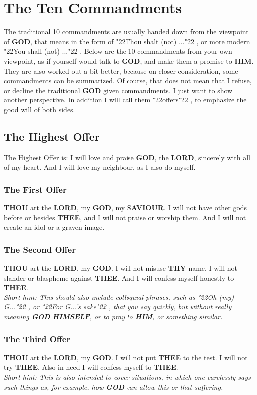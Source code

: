 \documentclass[12pt,a4paper]{article}
\newcommand{\God}[0]{\textbf{GOD}}
\newcommand{\Him}[0]{\textbf{HIM}}
\newcommand{\Himself}[0]{\textbf{HIMSELF}}
\newcommand{\Lord}[0]{\textbf{LORD}}
\newcommand{\Saviour}[0]{\textbf{SAVIOUR}}
\newcommand{\Thee}[0]{\textbf{THEE}}
\newcommand{\Thou}[0]{\textbf{THOU}}
\newcommand{\Thy}[0]{\textbf{THY}}
\newcommand{\q}[1]{\char"22{#1}\char"22 }
\begin{document}
	\section{The Ten Commandments}
		The traditional 10 commandments are usually handed down from the viewpoint of {\God},
		that means in the form of \q{Thou shalt (not) ...},
		or more modern \q{You shall (not) ...}.
		Below are the 10 commandments from your own viewpoint,
		as if yourself would talk to {\God},
		and make them a promise to {\Him}.
		They are also worked out a bit better,
		because on closer consideration,
		some commandments can be summarized.
		Of course,
		that does not mean that I refuse,
		or decline the traditional {\God} given commandments.
		I just want to show another perspective.
		In addition I will call them \q{offers},
		to emphasize the good will of both sides.
	
	\subsection{The Highest Offer}
		The Highest Offer is:
		I will love and praise {\God},
		the {\Lord},
		sincerely with all of my heart.
		And I will love my neighbour,
		as I also do myself.
		
	\subsubsection{The First Offer}
		{\Thou} art the {\Lord},
		my {\God},
		my {\Saviour}.
		I will not have other gods before or besides {\Thee},
		and I will not praise or worship them.
		And I will not create an idol or a graven image.
		
	\subsubsection{The Second Offer}
		{\Thou} art the {\Lord},
		my {\God}.
		I will not misuse {\Thy} name.
		I will not slander or blaspheme against {\Thee}.
		And I will confess myself honestly to {\Thee}.
		\\
		\textit{Short hint:
		This should also include colloquial phrases,
		such as \q{Oh (my) G...},
		or \q{For G...'s sake},
		that you say quickly,
		but without really meaning {\God} {\Himself},
		or to pray to {\Him},
		or something similar.}
			
	\subsubsection{The Third Offer}
		{\Thou} art the {\Lord},
		my {\God}.
		I will not put {\Thee} to the test.
		I will not try {\Thee}.
		Also in need I will confess myself to {\Thee}.
		\\
		\textit{Short hint:
		This is also intended to cover situations,
		in which one carelessly says such things as,
		for example,
		how {\God} can allow this or that suffering.}
		
\end{document}
